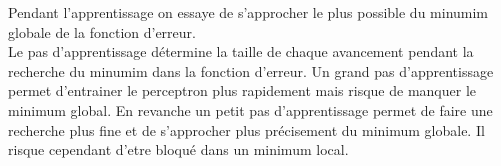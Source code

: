 \documentclass[twoside,openright,a4paper,11pt,french]{article}
\begin{document}
Pendant l'apprentissage on essaye de s'approcher le plus possible du minumim
globale de la fonction d'erreur.\\

Le pas d'apprentissage détermine la taille de chaque avancement pendant la
recherche du minumim dans la fonction d'erreur.  Un grand pas d'apprentissage
permet d'entrainer le perceptron plus rapidement mais risque de manquer le
minimum global. En revanche un petit pas d'apprentissage permet de faire une
recherche plus fine et de s'approcher plus précisement du minimum globale. Il
risque cependant d'etre bloqué dans un minimum local.\\






\end{document}
